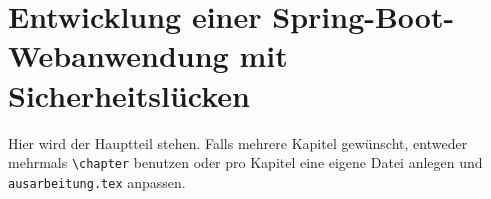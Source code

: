 \chapter{Entwicklung einer Spring-Boot-Webanwendung mit Sicherheitslücken}
\label{chap:k5}

Hier wird der Hauptteil stehen. Falls mehrere Kapitel gewünscht, entweder mehrmals \texttt{\textbackslash{}chapter} benutzen oder pro Kapitel eine eigene Datei anlegen und \texttt{ausarbeitung.tex} anpassen.
